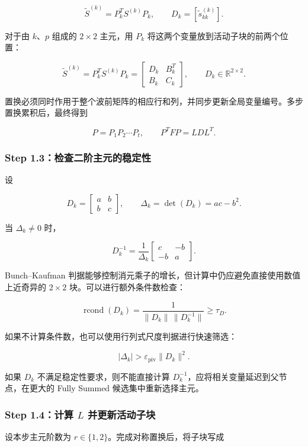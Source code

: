 \[
\widetilde S^{(k)}=P_k^TS^{(k)}P_k,
\qquad
D_k=\left[\widetilde s_{kk}^{(k)}\right].
\]

对于由 $k$、$p$ 组成的 $2\times2$ 主元，用 $P_k$ 将这两个变量放到活动子块的前两个位置：

\[
\widetilde S^{(k)}=P_k^TS^{(k)}P_k
=
\begin{bmatrix}
D_k&B_k^T\\
B_k&C_k
\end{bmatrix},
\qquad
D_k\in\mathbb R^{2\times2}.
\]

置换必须同时作用于整个波前矩阵的相应行和列，并同步更新全局变量编号。多步置换累积后，最终得到

\[
P=P_1P_2\cdots P_t,
\qquad
P^TFP=LDL^T.
\]

\subsubsection{Step 1.3：检查二阶主元的稳定性}

设

\[
D_k=
\begin{bmatrix}
a&b\\
b&c
\end{bmatrix},
\qquad
\Delta_k=\det(D_k)=ac-b^2.
\]

当 $\Delta_k\ne0$ 时，

\[
D_k^{-1}
=\frac{1}{\Delta_k}
\begin{bmatrix}
c&-b\\
-b&a
\end{bmatrix}.
\]

Bunch--Kaufman 判据能够控制消元乘子的增长，但计算中仍应避免直接使用数值上近奇异的 $2\times2$ 块。可以进行额外条件数检查：

\[
\operatorname{rcond}(D_k)
=\frac{1}{\|D_k\|\,\|D_k^{-1}\|}
\ge\tau_D.
\]

如果不计算条件数，也可以使用行列式尺度判据进行快速筛选：

\[
|\Delta_k|>
\varepsilon_{\mathrm{piv}}\|D_k\|^2.
\]

如果 $D_k$ 不满足稳定性要求，则不能直接计算 $D_k^{-1}$，应将相关变量延迟到父节点，在更大的 Fully Summed 候选集中重新选择主元。

\subsubsection{Step 1.4：计算 $L$ 并更新活动子块}

设本步主元阶数为 $r\in\{1,2\}$。完成对称置换后，将子块写成

